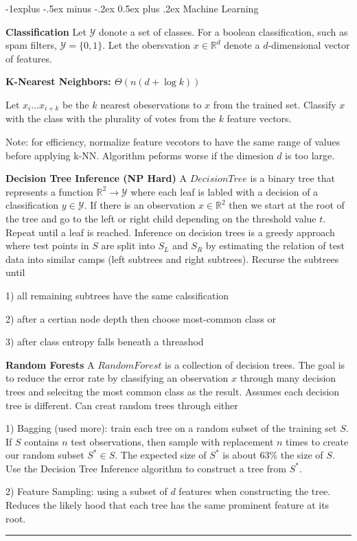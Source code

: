 \documentclass[landscape]{article}
\makeatletter
\renewcommand{\subsection}{\@startsection{subsection}{2}{0mm}%
                            {-1explus -.5ex minus -.2ex}%
                            {0.5ex plus .2ex}%
                            {\normalfont\normalsize\bfseries}}
\makeatother
\begin{document}
\begin{multicols}{3}
\subsection{Machine Learning}

\textbf{Classification}
Let $\mathcal{Y}$ donote a set of classes. For a boolean classification, such as spam filters, $\mathcal{Y} = \{0, 1\}$. Let the obersvation $x \in \mathbb{R}^d$ denote a $d$-dimensional vector of features.

\textbf{K-Nearest Neighbors: $\Theta(n(d + \log k))$}

Let $x_i \ldots x_{i+k}$ be the $k$ nearest obeservations to $x$ from the trained set. Classify $x$ with the class with the plurality of votes from the $k$ feature vectors.

Note: for efficiency, normalize feature vecotors to have the same range of values before applying k-NN. Algorithm peforms worse if the dimesion $d$ is too large.

\textbf{Decision Tree Inference (NP Hard)}
A $Decision Tree$ is a binary tree that represents a function $\mathbb{R}^2 \rightarrow \mathcal{Y}$ where each leaf is labled with a decision of a classification $y \in \mathcal{Y}$. If there is an observation $x \in \mathbb{R}^2$ then we start at the root of the tree and go to the left or right child depending on the threshold value $t$. Repeat until a leaf is reached. Inference on decision trees is a greedy approach where test points in $S$ are split into $S_L$ and $S_R$ by estimating the relation of test data into similar camps (left subtrees and right subtrees). Recurse the subtrees until 

1) all remaining subtrees have the same calssification

2) after a certian node depth then choose most-common class or

3) after class entropy falls beneath a threashod

\textbf{Random Forests}
A $RandomForest$ is a collection of decision trees. The goal is to reduce the error rate by classifying an observation $x$ through many decision trees and selecitng the most common class as the result. Assumes each decision tree is different. Can creat random  trees through either

1) Bagging (used more): train each tree on a random subset of the training set $S$. If $S$ contains $n$ test observations, then sample with replacement $n$ times to create our random subset $S^* \in S$. The expected size of $S^*$ is about 63\% the size of $S$. Use the Decision Tree Inference algorithm to construct a tree from $S^*$.

2) Feature Sampling: using a subset of $d$ features when constructing the tree. Reduces the likely hood that each tree has the same prominent feature at its root.


\rule{0.3\linewidth}{0.25pt}
\newpage
\scriptsize


\end{multicols}
\end{document}
